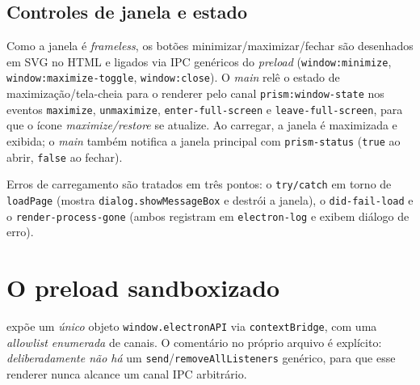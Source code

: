 \subsection{Controles de janela e estado}

Como a janela é \emph{frameless}, os botões minimizar/maximizar/fechar são
desenhados em SVG no HTML e ligados via IPC genéricos do \emph{preload}
(\lstinline|window:minimize|, \lstinline|window:maximize-toggle|,
\lstinline|window:close|). O \emph{main} relê o estado de maximização/tela-cheia
para o renderer pelo canal \lstinline|prism:window-state| nos eventos
\lstinline|maximize|, \lstinline|unmaximize|, \lstinline|enter-full-screen| e
\lstinline|leave-full-screen|, para que o ícone \emph{maximize/restore} se
atualize. Ao carregar, a janela é maximizada e exibida; o \emph{main} também
notifica a janela principal com \lstinline|prism-status| (\lstinline|true| ao
abrir, \lstinline|false| ao fechar).

Erros de carregamento são tratados em três pontos: o \lstinline|try/catch| em
torno de \lstinline|loadPage| (mostra \lstinline|dialog.showMessageBox| e destrói
a janela), o \lstinline|did-fail-load| e o \lstinline|render-process-gone|
(ambos registram em \lstinline|electron-log| e exibem diálogo de erro).

\section{O preload sandboxizado}

 expõe um \emph{único} objeto
\lstinline|window.electronAPI| via \lstinline|contextBridge|, com uma
\emph{allowlist enumerada} de canais. O comentário no próprio arquivo é
explícito: \emph{deliberadamente não há} um \lstinline|send|/\lstinline|removeAllListeners|
genérico, para que esse renderer nunca alcance um canal IPC arbitrário.

